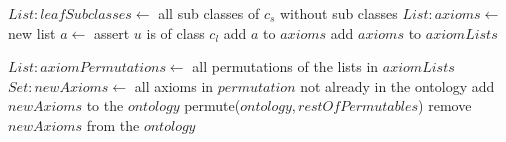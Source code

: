 \documentclass{article}
\begin{document}
\begin{algorithm}
\begin{algorithmic}[0]
		\State $List:leafSubclasses \leftarrow$ all sub classes of $c_s$ without sub classes
		\State $List:axioms \leftarrow$ new list
		\State
			\State $a \leftarrow$ assert $u$ is of class $c_l$
			\State add $a$ to $axioms$
		\EndFor
		\State
		\State add $axioms$ to $axiomLists$
	\EndFor

	\State
	\State $List:axiomPermutations \leftarrow$ all permutations of the lists in $axiomLists$
	\State
		\State $Set:newAxioms \leftarrow$ all axioms in $permutation$ not already in the ontology
		\State add $newAxioms$ to the $ontology$
		\State permute($ontology, restOfPermutables$)
		\State remove $newAxioms$ from the $ontology$
	\EndFor
	
\end{algorithmic}
\end{algorithm}




\end{document}
